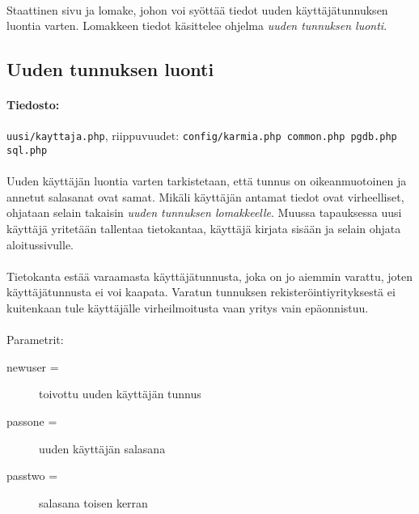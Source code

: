 \documentclass[11pt]{article}
\begin{document}
\paragraph{} Staattinen sivu ja lomake, johon voi syöttää tiedot uuden käyttäjätunnuksen luontia varten. Lomakkeen tiedot käsittelee ohjelma \emph{uuden tunnuksen luonti}.


\subsection{Uuden tunnuksen luonti}

\paragraph{Tiedosto:} \large{\texttt{uusi/kayttaja.php}}, riippuvuudet: \texttt{config/karmia.php common.php pgdb.php sql.php}

\paragraph{} Uuden käyttäjän luontia varten tarkistetaan, että tunnus on oikeanmuotoinen ja annetut salasanat ovat samat. Mikäli käyttäjän antamat tiedot ovat virheelliset, ohjataan selain takaisin \emph{uuden tunnuksen lomakkeelle}. Muussa tapauksessa uusi käyttäjä yritetään tallentaa tietokantaa, käyttäjä kirjata sisään ja selain ohjata aloitussivulle.

\paragraph{} Tietokanta estää varaamasta käyttäjätunnusta, joka on jo aiemmin varattu, joten käyttäjätunnusta ei voi kaapata. Varatun tunnuksen rekisteröintiyrityksestä ei kuitenkaan tule käyttäjälle virheilmoitusta vaan yritys vain epäonnistuu.

\paragraph{} Parametrit:
\begin{description}
\item[newuser =] toivottu uuden käyttäjän tunnus
\item[passone =] uuden käyttäjän salasana
\item[passtwo =] salasana toisen kerran
\end{description}

\end{document}
